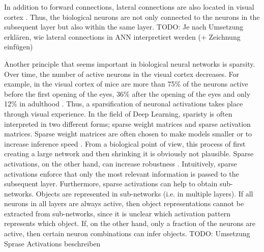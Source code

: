In addition to forward connections, lateral connections are also located in visual cortex .
Thus, the biological neurons are not only connected to the neurons in the subsequent layer but also within the same layer.
TODO: Je nach Umsetzung erklären, wie lateral connections in ANN interpretiert werden (+ Zeichnung einfügen)

Another principle that seems important in biological neural networks is sparsity.
Over time, the number of active neurons in the visual cortex decreases.
For example, in the visual cortex of mice are more than 75\% of the neurons active before the first opening of the eyes, 36\% after the opening of the eyes and only 12\% in adulthood .
Thus, a sparsification of neuronal activations takes place through visual experience.
In the field of Deep Learning, sparisty is often interpreted in two different forms; sparse weight matrices and sparse activation matrices.
Sparse weight matrices are often chosen to make models smaller or to increase inference speed \cite{Louizos_Welling_Kingma_2018, Hoefler_Alistarh_Ben_Nun_Dryden_Peste_2021}.
From a biological point of view, this process of first creating a large network and then shrinking it is obviously not plausible.
Sparse activations, on the other hand, can increase robustness \cite{Panousis_Chatzis_Theodoridis_2021}.
Intuitively, sparse activations enforce that only the most relevant information is passed to the subsequent layer.
Furthermore, sparse activations can help to obtain sub-networks.
Objects are represented in sub-networks (i.e. in multiple layers).
If all neurons in all layers are always active, then object representations cannot be extracted from sub-networks, since it is unclear which activation pattern represents which object.
If, on the other hand, only a fraction of the neurons are active, then certain neuron combinations can infer objects.
TODO: Umsetzung Sprase Activations beschreiben

